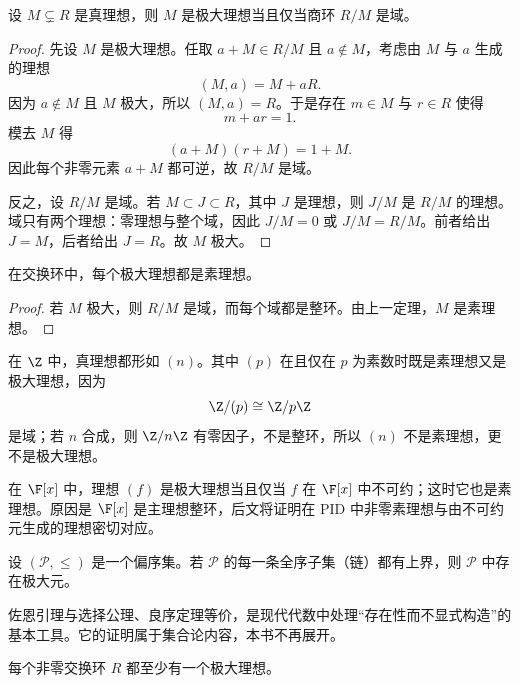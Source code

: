 \begin{theorem}
设 $M\subsetneq R$ 是真理想，则 $M$ 是极大理想当且仅当商环 $R/M$ 是域。
\end{theorem}

\begin{proof}
先设 $M$ 是极大理想。任取 $a+M\in R/M$ 且 $a\notin M$，考虑由 $M$ 与 $a$ 生成的理想
\[
(M,a)=M+aR.
\]
因为 $a\notin M$ 且 $M$ 极大，所以 $(M,a)=R$。于是存在 $m\in M$ 与 $r\in R$ 使得
\[
m+ar=1.
\]
模去 $M$ 得
\[
(a+M)(r+M)=1+M.
\]
因此每个非零元素 $a+M$ 都可逆，故 $R/M$ 是域。

反之，设 $R/M$ 是域。若 $M\subset J\subset R$，其中 $J$ 是理想，则 $J/M$ 是 $R/M$ 的理想。域只有两个理想：零理想与整个域，因此 $J/M=0$ 或 $J/M=R/M$。前者给出 $J=M$，后者给出 $J=R$。故 $M$ 极大。
\end{proof}

\begin{corollary}
在交换环中，每个极大理想都是素理想。
\end{corollary}

\begin{proof}
若 $M$ 极大，则 $R/M$ 是域，而每个域都是整环。由上一定理，$M$ 是素理想。
\end{proof}

\begin{example}
在 $\Z$ 中，真理想都形如 $(n)$。其中 $(p)$ 在且仅在 $p$ 为素数时既是素理想又是极大理想，因为
\[
\Z/(p)\cong \Z/p\Z
\]
是域；若 $n$ 合成，则 $\Z/n\Z$ 有零因子，不是整环，所以 $(n)$ 不是素理想，更不是极大理想。
\end{example}

\begin{example}
在 $\F[x]$ 中，理想 $(f)$ 是极大理想当且仅当 $f$ 在 $\F[x]$ 中不可约；这时它也是素理想。原因是 $\F[x]$ 是主理想整环，后文将证明在 PID 中非零素理想与由不可约元生成的理想密切对应。
\end{example}

\begin{theorem}[佐恩引理]
设 $(\mathcal{P},\le)$ 是一个偏序集。若 $\mathcal{P}$ 的每一条全序子集（链）都有上界，则 $\mathcal{P}$ 中存在极大元。
\end{theorem}

\begin{remark}
佐恩引理与选择公理、良序定理等价，是现代代数中处理“存在性而不显式构造”的基本工具。它的证明属于集合论内容，本书不再展开。
\end{remark}

\begin{theorem}
每个非零交换环 $R$ 都至少有一个极大理想。
\end{theorem}

